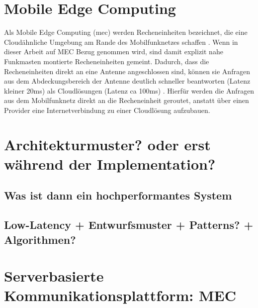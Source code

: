 \section{Mobile Edge Computing}

Als Mobile Edge Computing (\gls{mec}) werden Recheneinheiten bezeichnet, die eine Cloudähnliche Umgebung am Rande des Mobilfunknetzes schaffen \cite[4]{etsi:mec}.
Wenn in dieser Arbeit auf MEC Bezug genommen wird, sind damit explizit nahe Funkmasten montierte Recheneinheiten gemeint.
Dadurch, dass die Recheneinheiten direkt an eine Antenne angeschlossen sind, können sie Anfragen aus dem Abdeckungsbereich der Antenne deutlich schneller beantworten (Latenz kleiner 20ms) als Cloudlösungen (Latenz ca 100ms) \cite[2]{perf:mec:fraunhofer}.
Hierfür werden die Anfragen aus dem Mobilfunknetz direkt an die Recheneinheit geroutet, anstatt über einen Provider eine Internetverbindung zu einer Cloudlösung aufzubauen.



\section{Architekturmuster? oder erst während der Implementation?}



			
			
		\subsection{Was ist dann ein hochperformantes System}
		\subsection{Low-Latency + Entwurfsmuster + Patterns? + Algorithmen?}
			
			
			
			
			
	\section{Serverbasierte Kommunikationsplattform: MEC}
	
